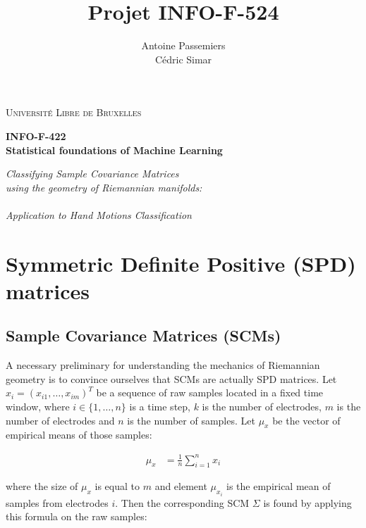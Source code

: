 \documentclass[a4paper,11pt]{report}
\title{Projet INFO-F-524}
\author{
	Antoine Passemiers \\
	Cédric Simar
}
\makeatletter
\renewcommand\bibname{Références}
\renewcommand{\refname}{Références}
\renewcommand\@biblabel[1]{#1.  }
\makeatother
\begin{document}
\renewcommand\bibname{References}
\renewcommand{\refname}{References}
\makeatletter
\renewcommand\@biblabel[1]{#1.  }
\makeatother

\begin{titlepage}
	\centering
	{\scshape\LARGE Université Libre de Bruxelles\par}
	\vfill
	{\LARGE\bfseries INFO-F-422 \\ Statistical foundations of Machine Learning \par
		\vspace{3ex}}
	{\itshape\Large Classifying Sample Covariance Matrices \\ using the geometry of Riemannian manifolds: \\\ \\ Application to Hand Motions Classification \par}
	\vfill
	\makeatletter
	{\large \@author\par}
	\vfill
	\@date\par
	\makeatother
\end{titlepage}

\tableofcontents

\setlength\parskip{0.5ex plus1ex minus.5ex}

\newpage



\chapter{Symmetric Definite Positive (SPD) matrices}

\section{Sample Covariance Matrices (SCMs)}

A necessary preliminary for understanding the mechanics of Riemannian geometry is to convince ourselves that
SCMs are actually SPD matrices. Let $x_i = (x_{i1}, \ldots, x_{im})^T$ be a sequence of raw samples
located in a fixed time window, where $i \in \{1, \ldots, n\}$ is a time step, $k$ is the number of electrodes,
$m$ is the number of electrodes and $n$ is the number of samples.
Let $\mu_x$ be the vector of empirical means of those samples:

\begin{align}
  \mu_x & = \frac{1}{n} \sum\limits_{i=1}^{n} x_i
\end{align}

\noindent where the size of $\mu_x$ is equal to $m$ and element
$\mu_{x_i}$ is the empirical mean of samples from electrodes $i$.
Then the corresponding SCM $\Sigma$ is found by applying this formula on the raw samples:
\end{document}
